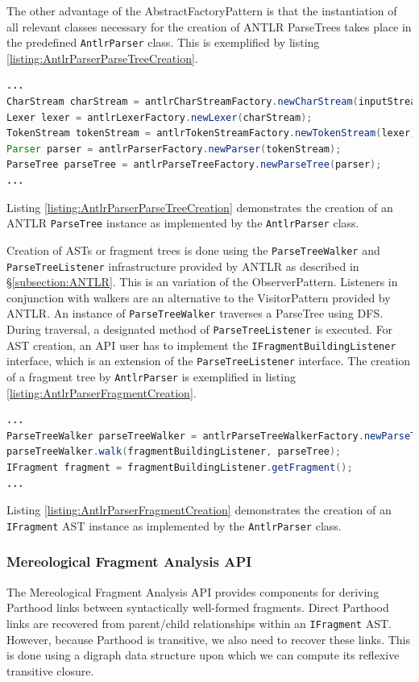 The other advantage of the \gls{AbstractFactoryPattern} is that the instantiation of all relevant classes necessary for the creation of \gls{ANTLR} \glspl{ParseTree} takes place in the predefined \texttt{AntlrParser} class.
This is exemplified by listing \ref{listing:AntlrParserParseTreeCreation}.
\begin{lstlisting}[language=Java,caption={AntlrParser ParseTree Creation},label={listing:AntlrParserParseTreeCreation}]
...
CharStream charStream = antlrCharStreamFactory.newCharStream(inputStream);
Lexer lexer = antlrLexerFactory.newLexer(charStream);
TokenStream tokenStream = antlrTokenStreamFactory.newTokenStream(lexer);
Parser parser = antlrParserFactory.newParser(tokenStream);
ParseTree parseTree = antlrParseTreeFactory.newParseTree(parser);
...
\end{lstlisting}
Listing \ref{listing:AntlrParserParseTreeCreation} demonstrates the creation of an \gls{ANTLR} \texttt{ParseTree} instance as implemented by the \texttt{AntlrParser} class.

Creation of \glspl{AST} or fragment trees is done using the \texttt{ParseTreeWalker} and \texttt{ParseTreeListener} infrastructure provided by \gls{ANTLR} as described in §\ref{subsection:ANTLR}.
This is an variation of the \gls{ObserverPattern}.
Listeners in conjunction with walkers are an alternative to the \gls{VisitorPattern} provided by \gls{ANTLR}.
An instance of \texttt{Parse\-Tree\-Walker} traverses a \gls{ParseTree} using \gls{DFS}.
During traversal, a designated method of \texttt{Parse\-Tree\-Listener} is executed.
For \gls{AST} creation, an \gls{API} user has to implement the \texttt{IFragmentBuildingListener} interface, which is an extension of the \texttt{ParseTreeListener} interface.
The creation of a fragment tree by \texttt{AntlrParser} is exemplified in listing \ref{listing:AntlrParserFragmentCreation}.
\begin{lstlisting}[language=Java,caption={AntlrParser Fragment Creation},label={listing:AntlrParserFragmentCreation}]
...
ParseTreeWalker parseTreeWalker = antlrParseTreeWalkerFactory.newParseTreeWalker();
parseTreeWalker.walk(fragmentBuildingListener, parseTree);
IFragment fragment = fragmentBuildingListener.getFragment();
...
\end{lstlisting}
Listing \ref{listing:AntlrParserFragmentCreation} demonstrates the creation of an \texttt{IFragment} \gls{AST} instance as implemented by the \texttt{AntlrParser} class.

\subsubsection{Mereological Fragment Analysis API}
\label{subsubsection:MereologicalFragmentAnalysisAPI}
The Mereological Fragment Analysis \gls{API} provides components for deriving \gls{Parthood} links between syntactically well-formed fragments.
Direct \gls{Parthood} links are recovered from parent/child relationships within an \texttt{IFragment} \gls{AST}.
However, because \gls{Parthood} is transitive, we also need to recover these links.
This is done using a digraph data structure upon which we can compute its reflexive transitive closure.

